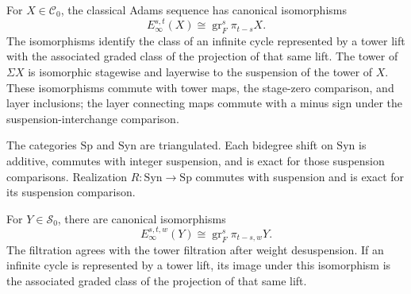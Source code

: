 \begin{definition}
\label{frontier:AdamsSynthetic:9a4b26f47efd}
For $X\in\mathcal C_0$, the classical Adams sequence has canonical isomorphisms
\[
E_\infty^{s,t}(X)\cong\operatorname{gr}_F^s\pi_{t-s}X.
\]
The isomorphisms identify the class of an infinite cycle represented by a tower lift with the associated graded class of the projection of that same lift. The tower of $\Sigma X$ is isomorphic stagewise and layerwise to the suspension of the tower of $X$. These isomorphisms commute with tower maps, the stage-zero comparison, and layer inclusions; the layer connecting maps commute with a minus sign under the suspension-interchange comparison.
\end{definition}


\begin{definition}
\label{frontier:AdamsSynthetic:d505f4e20090}
The categories $\mathrm{Sp}$ and $\mathrm{Syn}$ are triangulated. Each bidegree shift on $\mathrm{Syn}$ is additive, commutes with integer suspension, and is exact for those suspension comparisons. Realization $R\colon\mathrm{Syn}\to\mathrm{Sp}$ commutes with suspension and is exact for its suspension comparison.
\end{definition}


\begin{definition}
\label{frontier:AdamsSynthetic:f083536a377e}
For $Y\in\mathcal S_0$, there are canonical isomorphisms
\[
E_\infty^{s,t,w}(Y)\cong\operatorname{gr}_F^s\pi_{t-s,w}Y.
\]
The filtration agrees with the tower filtration after weight desuspension. If an infinite cycle is represented by a tower lift, its image under this isomorphism is the associated graded class of the projection of that same lift.
\end{definition}


